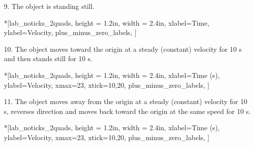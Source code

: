 9. The object is standing still.

\begin{lab_axis}*[lab_noticks_2quads,
	height = {1.2in}, width = {2.4in},
	xlabel={Time},
	ylabel={Velocity},
	plus_minus_zero_labels,
	]
\end{lab_axis}

10. The object moves toward the origin at a steady (constant) velocity for 10
s and then stands still for 10 s.

\begin{lab_axis}*[lab_noticks_2quads,
	height = {1.2in}, width = {2.4in},
	xlabel={Time (s)},
	ylabel={Velocity},
	xmax=23,
	xtick={10,20},
	plus_minus_zero_labels,
	]
\end{lab_axis}


11. The object moves away from the origin at a steady (constant) velocity for
10 s, reverses direction and moves back toward the origin at the same speed
for 10 s.

\begin{lab_axis}*[lab_noticks_2quads,
	height = {1.2in}, width = {2.4in},
	xlabel={Time (s)},
	ylabel={Velocity},
	xmax=23,
	xtick={10,20},
	plus_minus_zero_labels,
	]
\end{lab_axis}


